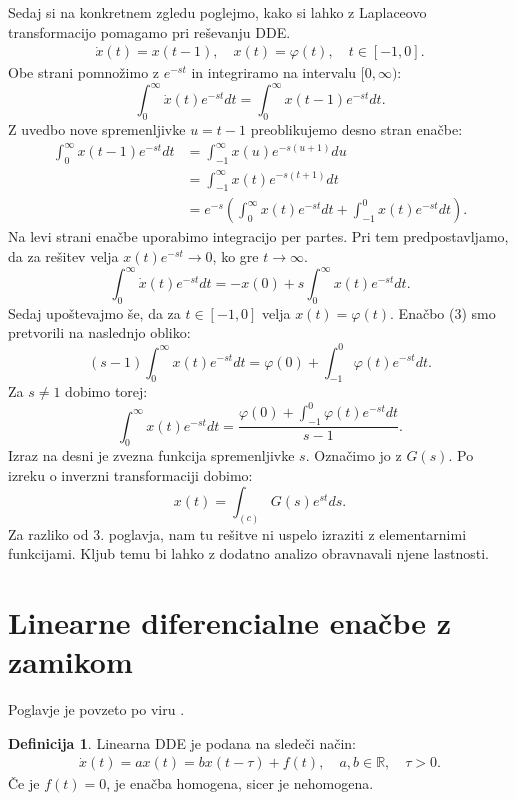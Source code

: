 \documentclass[12pt,a4paper]{amsart}
\theoremstyle{definition} %
\newtheorem{definicija}{Definicija}[section]
\theoremstyle{plain} %
\newcommand{\R}{\mathbb R}
\begin{document}
    Sedaj si na konkretnem zgledu poglejmo, kako si lahko z Laplaceovo transformacijo pomagamo pri reševanju DDE.
    \begin{equation} \label{eq3}
        \begin{split}
            \dot{x}(t)=x(t-1), \quad x(t)=\varphi(t), \quad t\in[-1,0].
        \end{split}
    \end{equation}
    Obe strani pomnožimo z $e^{-st}$ in integriramo na intervalu $[0,\infty)$:
     \[\int_{0}^{\infty}\dot{x}(t)e^{-st}dt = \int_{0}^{\infty}x(t-1)e^{-st}dt.\]
    Z uvedbo nove spremenljivke $u=t-1$ preoblikujemo desno stran enačbe:
    \begin{equation*}
        \begin{split}
            \int_{0}^{\infty}x(t-1)e^{-st}dt &= \int_{-1}^{\infty}x(u)e^{-s(u+1)}du \\
             &= \int_{-1}^{\infty}x(t)e^{-s(t+1)}dt \\
             &= e^{-s}\left(\int_{0}^{\infty}x(t)e^{-st}dt + \int_{-1}^{0}x(t)e^{-st}dt\right). 
        \end{split}      
    \end{equation*}
    Na levi strani enačbe uporabimo integracijo per partes. Pri tem predpostavljamo, da za 
    rešitev velja $x(t)e^{-st} \to 0$, ko gre $t \to\infty$.
    \[\int_{0}^{\infty}\dot{x}(t)e^{-st}dt=-x(0)+s\int_{0}^{\infty}x(t)e^{-st}dt.\]
    Sedaj upoštevajmo še, da za $t\in[-1,0]$ velja $x(t)=\varphi(t)$. Enačbo (3) smo pretvorili na naslednjo obliko:
    \[(s-1)\int_{0}^{\infty}x(t)e^{-st}dt=\varphi(0)+\int_{-1}^0\varphi(t)e^{-st}dt.\]
    Za $s\neq 1$ dobimo torej:
    \[\int_{0}^{\infty}x(t)e^{-st}dt=\frac{\varphi(0)+\int_{-1}^0\varphi(t)e^{-st}dt}{s-1}.\]
    Izraz na desni je zvezna funkcija spremenljivke $s$. Označimo jo z $G(s)$. Po izreku o inverzni
    transformaciji dobimo:
    \[x(t)=\int_{(c)}G(s)e^{st}ds.\]
    Za razliko od 3. poglavja, nam tu rešitve ni uspelo
    izraziti z elementarnimi funkcijami. Kljub temu bi lahko z dodatno analizo obravnavali njene lastnosti.

\section{Linearne diferencialne enačbe z zamikom}

Poglavje je povzeto po viru \cite{angdiploma}.

\begin{definicija}
    Linearna DDE je podana na sledeči način:
    \begin{equation} \label{eq4}
        \begin{split}
            \dot{x}(t)=ax(t)=bx(t-\tau)+f(t),\quad a,b\in\R, \quad \tau>0.
        \end{split}
    \end{equation}
    Če je $f(t)=0$, je enačba homogena, sicer je nehomogena. 
\end{definicija}
\end{document}
